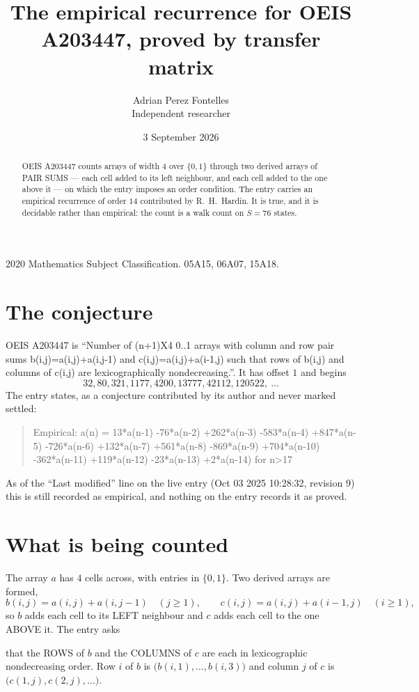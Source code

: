 \documentclass[11pt,a4paper]{article}
\title{The empirical recurrence for OEIS A203447, proved by transfer matrix}
\author{Adrian Perez Fontelles\\ \small Independent researcher}
\date{3 September 2026}
\theoremstyle{plain}
\theoremstyle{definition}
\begin{document}
\maketitle

\begin{abstract}
OEIS A203447 counts arrays of width $4$ over $\{0,1\}$ through two derived arrays of PAIR SUMS ---
each cell added to its left neighbour, and each cell added to the one above it --- on which the
entry imposes an order condition. The entry carries an empirical recurrence of order $14$
contributed by R.~H.~Hardin. It is true, and it is decidable rather than empirical: the count is
a walk count on $S=76$ states.
\end{abstract}

\noindent\small 2020 Mathematics Subject Classification. 05A15, 06A07, 15A18.\normalsize

\section{The conjecture}

OEIS A203447 is ``Number of (n+1)X4 0..1 arrays with column and row pair sums b(i,j)=a(i,j)+a(i,j-1) and c(i,j)=a(i,j)+a(i-1,j) such that rows of b(i,j) and columns of c(i,j) are lexicographically nondecreasing.''. It has offset $1$ and begins
\[
32, 80, 321, 1177, 4200, 13777, 42112, 120522,\ \dots
\]
The entry states, as a conjecture contributed by its author and never marked settled:
\begin{quote}
Empirical: a(n) = 13*a(n-1) -76*a(n-2) +262*a(n-3) -583*a(n-4) +847*a(n-5) -726*a(n-6) +132*a(n-7) +561*a(n-8) -869*a(n-9) +704*a(n-10) -362*a(n-11) +119*a(n-12) -23*a(n-13) +2*a(n-14) for n>17
\end{quote}
As of the ``Last modified'' line on the live entry (Oct 03 2025 10:28:32, revision 9) this is still
recorded as empirical, and nothing on the entry records it as proved.

\section{What is being counted}

The array $a$ has $4$ cells across, with entries in $\{0,1\}$. Two derived arrays are formed,
\[
b(i,j)=a(i,j)+a(i,j-1)\quad(j\ge1),\qquad c(i,j)=a(i,j)+a(i-1,j)\quad(i\ge1),
\]
so $b$ adds each cell to its LEFT neighbour and $c$ adds each cell to the one ABOVE it. The
entry asks

that the ROWS of $b$ and the COLUMNS of $c$ are each in lexicographic nondecreasing order. Row $i$ of $b$
is $\bigl(b(i,1),\dots,b(i,3)\bigr)$ and column $j$ of $c$ is
$\bigl(c(1,j),c(2,j),\dots\bigr)$.
\end{document}
